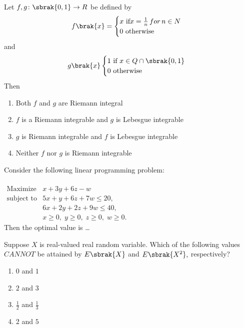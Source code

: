  \iffalse
\chapter{2013}
\author{EE24BTECH11021 - Eshan Ray}
\section{ma}
\fi
    \item Let $f,g\colon\sbrak{0,1}\to R$ be defined by
        $$f\brak{x}=
        \begin{cases}
            x \text{ if} x=\frac{1}{n}\,for\,n\in N\\
            0 \text{ otherwise}
        \end{cases}
        $$ and
        $$g\brak{x}
        \begin{cases}
            1 \text{ if } x\in Q\cap\sbrak{0,1}\\
            0 \text{ otherwise}
        \end{cases}
        $$ Then
    \begin{enumerate}
        \item Both $f$ and $g$ are Riemann integral
        \item $f$ is a Riemann integrable and $g$ is Lebesgue integrable
        \item $g$ is Riemann integrable and $f$ is Lebesgue integrable
        \item Neither $f$ nor $g$ is Riemann integrable
    \end{enumerate}
    \item Consider the following linear programming problem$\colon$\\ \\
  $  \begin{array}{cr}
\text{Maximize} & x + 3y + 6z - w \\
\text{subject to} & 5x + y + 6z + 7w \leq 20, \\
& 6x + 2y + 2z + 9w \leq 40, \\
& x \geq 0, \; y \geq 0, \; z \geq 0, \; w \geq 0.
\end{array} $ \\
Then the optimal value is \dots
    \item Suppose $X$ is real-valued real random variable. Which of the following values $CANNOT$ be attained by $E\sbrak{X}$ and $E\sbrak{X^2},$ respectively?
    \begin{enumerate}
        \item $0$ and $1$ 
        \item $2$ and $3$ 
        \item $\frac{1}{2}$ and $\frac{1}{3}$
        \item $2$ and $5$
    \end{enumerate}
